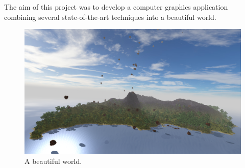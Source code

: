 The aim of this project was to develop a computer graphics application combining several state-of-the-art techniques into a beautiful world. 
\begin{figure}[H]
  \centering
  \includegraphics[width=1.0\linewidth]{images/front.png}
  \caption{A beautiful world.}
  \label{fig:beautifulIsland}
\end{figure}%